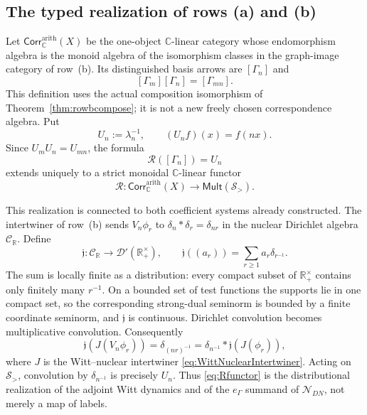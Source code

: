 \documentclass[11pt]{amsart}
\theoremstyle{definition}
\theoremstyle{remark}
\newcommand{\C}{\mathbb C}
\newcommand{\R}{\mathbb R}
\begin{document}
\subsection{The typed realization of rows (a) and (b)}

Let $\mathsf{Corr}_{\C}^{\mathrm{arith}}(X)$ be the one-object
$\C$-linear category whose endomorphism algebra is the monoid algebra of
the isomorphism classes in the graph-image category of row~(b).  Its
distinguished basis arrows are $[\Gamma_n]$ and
\begin{equation}\label{eq:linearizedcomposition}
 [\Gamma_m][\Gamma_n]=[\Gamma_{mn}].
\end{equation}
This definition uses the actual composition isomorphism of
Theorem~\ref{thm:rowbcompose}; it is not a new freely chosen correspondence
algebra.  Put
\begin{equation}\label{eq:Un}
 U_n:=\lambda_n^{-1},\qquad (U_nf)(x)=f(nx).
\end{equation}
Since $U_mU_n=U_{mn}$, the formula
\begin{equation}\label{eq:Rfunctor}
 \mathcal R([\Gamma_n])=U_n
\end{equation}
extends uniquely to a strict monoidal $\C$-linear functor
\[
 \mathcal R:\mathsf{Corr}_{\C}^{\mathrm{arith}}(X)
       \longrightarrow\mathsf{Mult}(\mathcal S_>).
\]

This realization is connected to both coefficient systems already
constructed.  The intertwiner of row~(b) sends
$V_n\phi_r$ to $\delta_n*\delta_r=\delta_{nr}$ in the nuclear Dirichlet
algebra $\mathcal C_{\R}$.  Define
\begin{equation}\label{eq:DirichletDistributionMap}
 \mathfrak j:\mathcal C_{\R}\longrightarrow
 \mathcal D'(\R_+^\times),\qquad
 \mathfrak j((a_r))=\sum_{r\geq1}a_r\delta_{r^{-1}}.
\end{equation}
The sum is locally finite as a distribution: every compact subset of
$\R_+^\times$ contains only finitely many $r^{-1}$.  On a bounded set of
test functions the supports lie in one compact set, so the corresponding
strong-dual seminorm is bounded by a finite coordinate seminorm, and
$\mathfrak j$ is continuous.  Dirichlet convolution becomes multiplicative
convolution.  Consequently
\begin{equation}\label{eq:fullintertwiner}
 \mathfrak j(J(V_n\phi_r))
 =\delta_{(nr)^{-1}}
 =\delta_{n^{-1}}*\mathfrak j(J(\phi_r)),
\end{equation}
where $J$ is the Witt--nuclear intertwiner
\eqref{eq:WittNuclearIntertwiner}.  Acting on $\mathcal S_>$, convolution by
$\delta_{n^{-1}}$ is precisely $U_n$.  Thus \eqref{eq:Rfunctor} is the
distributional realization of the adjoint Witt dynamics and of the
$e_\Gamma$ summand of $\mathcal N_{DN}$, not merely a map of labels.
\end{document}

